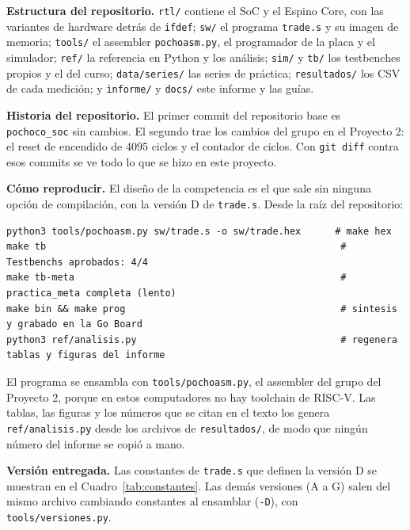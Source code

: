 \documentclass[11pt,letterpaper]{article}
\begin{document}
\textbf{Estructura del repositorio.} \texttt{rtl/} contiene el SoC y el Espino Core, con las variantes
de hardware detrás de \texttt{ifdef}; \texttt{sw/} el programa \texttt{trade.s} y su imagen de memoria;
\texttt{tools/} el assembler \texttt{pochoasm.py}, el programador de la placa y el simulador; \texttt{ref/}
la referencia en Python y los análisis; \texttt{sim/} y \texttt{tb/} los testbenches propios y el del curso;
\texttt{data/series/} las series de práctica; \texttt{resultados/} los CSV de cada medición; y
\texttt{informe/} y \texttt{docs/} este informe y las guías.

\textbf{Historia del repositorio.} El primer commit del repositorio base es \texttt{pochoco\_soc} sin
cambios. El segundo trae los cambios del grupo en el Proyecto 2: el reset de encendido de 4095 ciclos
y el contador de ciclos. Con \texttt{git diff} contra esos commits se ve todo lo que se hizo en este
proyecto.

\textbf{Cómo reproducir.} El diseño de la competencia es el que sale sin ninguna opción de compilación,
con la versión D de \texttt{trade.s}. Desde la raíz del repositorio:

\begin{lstlisting}[language={},caption={Ensamblar \texttt{trade.s} y correr el testbench del curso.}]
python3 tools/pochoasm.py sw/trade.s -o sw/trade.hex      # make hex
make tb                                                    # Testbenchs aprobados: 4/4
make tb-meta                                               # practica_meta completa (lento)
make bin && make prog                                      # sintesis y grabado en la Go Board
python3 ref/analisis.py                                    # regenera tablas y figuras del informe
\end{lstlisting}

El programa se ensambla con \texttt{tools/pochoasm.py}, el assembler del grupo del Proyecto 2, porque
en estos computadores no hay toolchain de RISC-V. Las tablas, las figuras y los números que se citan en
el texto los genera \texttt{ref/analisis.py} desde los archivos de \texttt{resultados/}, de modo que
ningún número del informe se copió a mano.

\textbf{Versión entregada.} Las constantes de \texttt{trade.s} que definen la versión D se muestran en el
Cuadro~\ref{tab:constantes}. Las demás versiones (A a G) salen del mismo archivo cambiando constantes al
ensamblar (\texttt{-D}), con \texttt{tools/versiones.py}.
\end{document}
